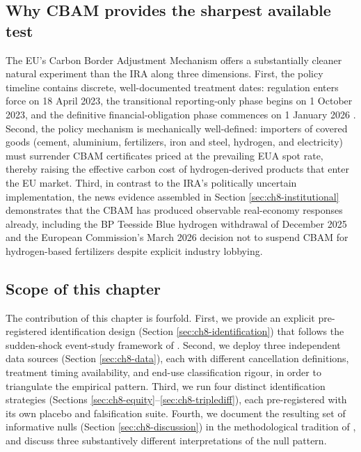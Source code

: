 \documentclass[11pt,a4paper]{article}
\begin{document}
\subsection{Why CBAM provides the sharpest available test}

The EU's Carbon Border Adjustment Mechanism offers a substantially cleaner natural experiment than the IRA along three dimensions. First, the policy timeline contains discrete, well-documented treatment dates: regulation enters force on 18 April 2023, the transitional reporting-only phase begins on 1 October 2023, and the definitive financial-obligation phase commences on 1 January 2026 \citep{ec2023cbam}. Second, the policy mechanism is mechanically well-defined: importers of covered goods (cement, aluminium, fertilizers, iron and steel, hydrogen, and electricity) must surrender CBAM certificates priced at the prevailing EUA spot rate, thereby raising the effective carbon cost of hydrogen-derived products that enter the EU market. Third, in contrast to the IRA's politically uncertain implementation, the news evidence assembled in Section \ref{sec:ch8-institutional} demonstrates that the CBAM has produced observable real-economy responses already, including the BP Teesside Blue hydrogen withdrawal of December 2025 and the European Commission's March 2026 decision not to suspend CBAM for hydrogen-based fertilizers despite explicit industry lobbying.

\subsection{Scope of this chapter}

The contribution of this chapter is fourfold. First, we provide an explicit pre-registered identification design (Section \ref{sec:ch8-identification}) that follows the sudden-shock event-study framework of \citet{hanemaaijer2024minority}. Second, we deploy three independent data sources (Section \ref{sec:ch8-data}), each with different cancellation definitions, treatment timing availability, and end-use classification rigour, in order to triangulate the empirical pattern. Third, we run four distinct identification strategies (Sections \ref{sec:ch8-equity}--\ref{sec:ch8-triplediff}), each pre-registered with its own placebo and falsification suite. Fourth, we document the resulting set of informative nulls (Section \ref{sec:ch8-discussion}) in the methodological tradition of \citet{ketel2023unimportance}, and discuss three substantively different interpretations of the null pattern.
\end{document}

